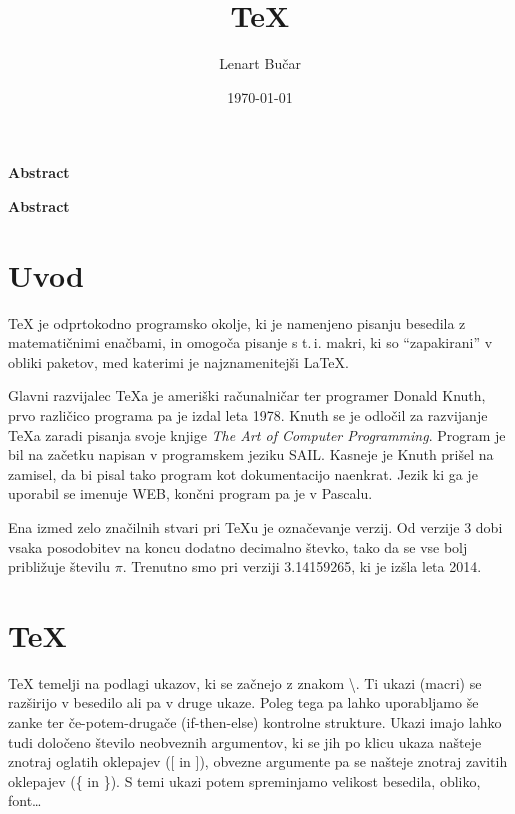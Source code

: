 \documentclass[a4paper]{book}
\author{Lenart Bučar}
\title{\TeX{}}
\date{\today}
\makeatletter
\newcommand\tbs{\textbackslash{}}
\newcommand\abstractname{Abstract}
\newenvironment{abstract}{
      \titlepage
      \null\vfil
      \@beginparpenalty\@lowpenalty
      \begin{center}
        \bfseries \abstractname
        \@endparpenalty\@M
      \end{center}}
     {\par\vfil\null\endtitlepage}
\newenvironment{abstract}{
      \if@twocolumn
        \section*{\abstractname}
      \else
        \small
        \begin{center}
          {\bfseries \abstractname\vspace{-.5em}\vspace{\z@}}
        \end{center}
        \quotation
      \fi}
      {\if@twocolumn\else\endquotation\fi}
\makeatother
\begin{document}
\frontmatter{}
\maketitle{}

\begin{abstract}

\end{abstract}

\begin{abstract}

\end{abstract}

\tableofcontents

\mainmatter


\chapter{Uvod}
\TeX{} je odprtokodno programsko okolje, ki je namenjeno pisanju besedila z matematičnimi enačbami, in omogoča pisanje s t.\,i. makri, ki so ``zapakirani'' v obliki paketov, med katerimi je najznamenitejši \LaTeX{}.

Glavni razvijalec \TeX{}a je ameriški računalničar ter programer Donald Knuth, prvo različico programa pa je izdal leta 1978. Knuth se je odločil za razvijanje \TeX{}a zaradi pisanja svoje knjige \textit{The Art of Computer Programming}.
Program je bil na začetku napisan v programskem jeziku SAIL. Kasneje je Knuth prišel na zamisel, da bi pisal tako program kot dokumentacijo naenkrat. Jezik ki ga je uporabil se imenuje WEB, končni program pa je v Pascalu.

Ena izmed zelo značilnih stvari pri \TeX{}u je označevanje verzij. Od verzije 3 dobi vsaka posodobitev na koncu dodatno decimalno števko, tako da se vse bolj približuje številu $\pi$. Trenutno smo pri verziji 3.14159265, ki je izšla leta 2014.


\chapter{\TeX{}}
\TeX{} temelji na podlagi ukazov, ki se začnejo z znakom \tbs{}. Ti ukazi (macri) se razširijo v besedilo ali pa v druge ukaze. Poleg tega pa lahko uporabljamo še zanke ter če-potem-drugače (if-then-else) kontrolne strukture. Ukazi imajo lahko tudi določeno število neobveznih argumentov, ki se jih po klicu ukaza našteje znotraj oglatih oklepajev ([ in ]), obvezne argumente pa se našteje znotraj zavitih oklepajev (\{ in \}).
S temi ukazi potem spreminjamo velikost besedila, obliko, font\ldots
\end{document}
